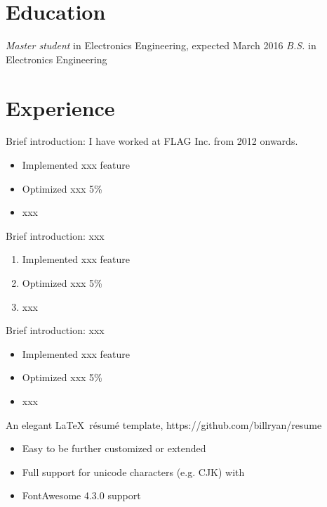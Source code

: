 \documentclass{resume}
\begin{document}


 
\section{Education}
\textit{Master student} in Electronics Engineering, expected March 2016
\textit{B.S.} in Electronics Engineering

\section{Experience}
Brief introduction: I have worked at FLAG Inc. from 2012 onwards.
\begin{itemize}
  \item Implemented xxx feature
  \item Optimized xxx 5\%
  \item xxx
\end{itemize}

Brief introduction: xxx
\begin{enumerate}
  \item Implemented xxx feature
  \item Optimized xxx 5\%
  \item xxx
\end{enumerate}

Brief introduction: xxx
\begin{itemize}
  \item Implemented xxx feature
  \item Optimized xxx 5\%
  \item xxx
\end{itemize}

An elegant \LaTeX\ résumé template, https://github.com/billryan/resume
\begin{itemize}
  \item Easy to be further customized or extended
  \item Full support for unicode characters (e.g. CJK) with \XeLaTeX\
  \item FontAwesome 4.3.0 support
\end{itemize}
\end{document}
